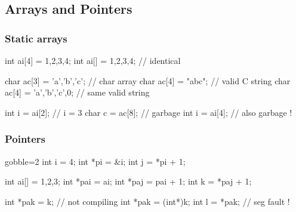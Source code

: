 \subsection[Pointers]{Arrays and Pointers}

\begin{frame}[fragile]
  \frametitle{Static arrays}
  \begin{cppcode}
    int ai[4] = {1,2,3,4};
    int ai[] = {1,2,3,4};  // identical
    
    char ac[3] = {'a','b','c'};   // char array
    char ac[4] = "abc";           // valid C string
    char ac[4] = {'a','b','c',0}; // same valid string
    
    int i = ai[2];  // i = 3
    char c = ac[8]; // garbage
    int i = ai[4];  // also garbage !
  \end{cppcode}
\end{frame}

\begin{frame}[fragile]
  \frametitle{Pointers}
  \begin{multicols}{2}
    \begin{cppcode*}{gobble=2}
      int i = 4;
      int *pi = &i;
      int j = *pi + 1;
      
      int ai[] = {1,2,3};
      int *pai = ai;
      int *paj = pai + 1;
      int k = *paj + 1;
      
      int *pak = k; // not compiling
      int *pak = (int*)k;
      int l = *pak; // seg fault !
    \end{cppcode*}
  \end{multicols}
\end{frame}

